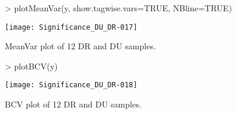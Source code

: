 \documentclass{article}
\begin{document}
\begin{figure}[H]
\centering
\begin{Schunk}
\begin{Sinput}
> plotMeanVar(y, show.tagwise.vars=TRUE, NBline=TRUE)
\end{Sinput}
\end{Schunk}
\texttt{[image: Significance\_DU\_DR-017]}
\caption{MeanVar plot of 12 DR and DU samples.}
\label{MDS}
\end{figure}

\begin{figure}[H]
\centering
\begin{Schunk}
\begin{Sinput}
> plotBCV(y)
\end{Sinput}
\end{Schunk}
\texttt{[image: Significance\_DU\_DR-018]}
\caption{BCV plot of 12 DR and DU samples.}
\label{MDS}
\end{figure}
\end{document}
